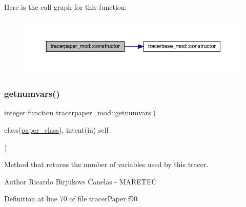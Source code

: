 Here is the call graph for this function\+:\nopagebreak
\begin{figure}[H]
\begin{center}
\leavevmode
\includegraphics[width=350pt]{namespacetracerpaper__mod_ad1bbc9d4e889b6aab71f0333cf6a5365_cgraph}
\end{center}
\end{figure}
\mbox{\label{namespacetracerpaper__mod_a62f88159b0746351f3b3a09a6a9dfff4}} 
\subsubsection{\texorpdfstring{getnumvars()}{getnumvars()}}
{\footnotesize\ttfamily integer function tracerpaper\+\_\+mod\+::getnumvars (\begin{DoxyParamCaption}\item[{class(\mbox{\hyperlink{structtracerpaper__mod_1_1paper__class}{paper\+\_\+class}}), intent(in)}]{self }\end{DoxyParamCaption})\hspace{0.3cm}{\ttfamily [private]}}



Method that returns the number of variables used by this tracer. 

\begin{DoxyAuthor}{Author}
Ricardo Birjukovs Canelas -\/ M\+A\+R\+E\+T\+EC 
\end{DoxyAuthor}


Definition at line 70 of file tracer\+Paper.\+f90.


